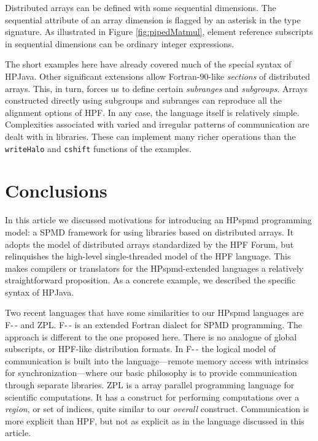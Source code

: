 Distributed arrays can be defined with some sequential dimensions.  The
sequential attribute of an array dimension is flagged by an asterisk in
the type signature.  As illustrated in Figure \ref{fig:pipedMatmul},
element reference subscripts in sequential dimensions can be ordinary
integer expressions.

The short examples here have already covered much of the special syntax
of HPJava.  Other significant extensions allow Fortran-90-like {\em
sections} of distributed arrays.  This, in turn, forces us to define
certain {\em subranges} and {\em subgroups}.  Arrays constructed
directly using subgroups and subranges can reproduce all the alignment
options of HPF.  In any case, the language itself is relatively
simple.  Complexities associated with varied and irregular patterns of
communication are dealt with in libraries.  These can implement many
richer operations than the {\tt writeHalo} and {\tt cshift} functions
of the examples.

\section{Conclusions}

In this article we discussed motivations for introducing an HPspmd
programming model: a SPMD framework for using libraries based on
distributed arrays.  It adopts the model of distributed arrays
standardized by the HPF Forum, but relinquishes the high-level
single-threaded model of the HPF language.  This makes compilers or
translators for the HPspmd-extended languages a relatively
straightforward proposition.  As a concrete example, we described the
specific syntax of HPJava.

Two recent languages that have some similarities to our HPspmd
languages are F-\,- and ZPL.  F-\,- \cite{FMM} is an extended Fortran
dialect for SPMD programming.  The approach is different to the one
proposed here.  There is no analogue of global subscripts, or HPF-like
distribution formats.  In F-\,- the logical model of communication is
built into the language---remote memory access with intrinsics for
synchronization---where our basic philosophy is to provide
communication through separate libraries.  ZPL \cite{ZPL} is a
array parallel programming language for scientific computations.
It has a construct for performing computations over a {\em region}, or
set of indices, quite similar to our {\em overall} construct.
Communication is more explicit than HPF, but not as
explicit as in the language discussed in this article.

